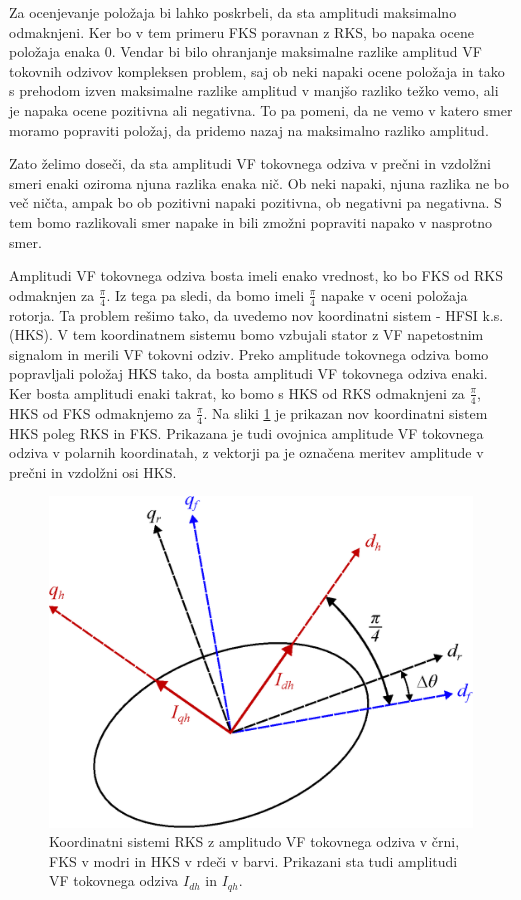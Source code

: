 \documentclass[a4paper,twoside,openright,12pt,slovene]{book}
\begin{document}
Za ocenjevanje položaja bi lahko poskrbeli, da sta amplitudi maksimalno odmaknjeni. Ker bo v tem primeru FKS poravnan z RKS, bo napaka ocene položaja enaka 0. Vendar bi bilo ohranjanje maksimalne
razlike amplitud VF tokovnih odzivov kompleksen problem, saj ob neki napaki ocene položaja in tako s prehodom izven maksimalne razlike amplitud v manjšo razliko težko vemo, ali je napaka ocene
pozitivna ali negativna. To pa pomeni, da ne vemo v katero smer moramo popraviti položaj, da pridemo nazaj na maksimalno razliko amplitud.

Zato želimo doseči, da sta amplitudi VF tokovnega odziva v prečni in vzdolžni smeri enaki oziroma njuna razlika enaka nič. Ob neki napaki, njuna razlika ne bo več ničta, ampak bo ob pozitivni napaki
pozitivna, ob negativni pa negativna. S tem bomo razlikovali smer napake in bili zmožni popraviti napako v nasprotno smer. 

Amplitudi VF tokovnega odziva bosta imeli enako vrednost, ko bo FKS od RKS odmaknjen za $\frac{\pi}{4}$. Iz tega pa sledi, da bomo imeli $\frac{\pi}{4}$ napake v oceni položaja rotorja. Ta problem
rešimo tako, da uvedemo nov koordinatni sistem - HFSI k.s. (HKS). V tem koordinatnem sistemu bomo vzbujali stator z VF napetostnim signalom in merili VF tokovni odziv. Preko amplitude tokovnega odziva
bomo popravljali položaj HKS tako, da bosta amplitudi VF tokovnega odziva enaki. Ker bosta amplitudi enaki takrat, ko bomo s HKS od RKS odmaknjeni za $\frac{\pi}{4}$, HKS od FKS odmaknjemo za
$\frac{\pi}{4}$. 
\newpage
Na sliki \ref{koordinatniSistem} je prikazan nov koordinatni sistem HKS poleg RKS in FKS. Prikazana je tudi ovojnica amplitude VF tokovnega odziva v polarnih koordinatah, z vektorji pa je označena
meritev amplitude v prečni in vzdolžni osi HKS. 

\begin{figure}[!htbp]
    \centering
    \includegraphics[width=0.7\columnwidth]{Slike/Inkscape/koordinatniSistem.eps}
    \caption{\label{koordinatniSistem} Koordinatni sistemi RKS z amplitudo VF tokovnega odziva v črni, FKS v modri in HKS v rdeči v barvi. Prikazani sta tudi amplitudi VF tokovnega odziva $I_{dh}$ in
    $I_{qh}$.}
\end{figure}
\end{document}
